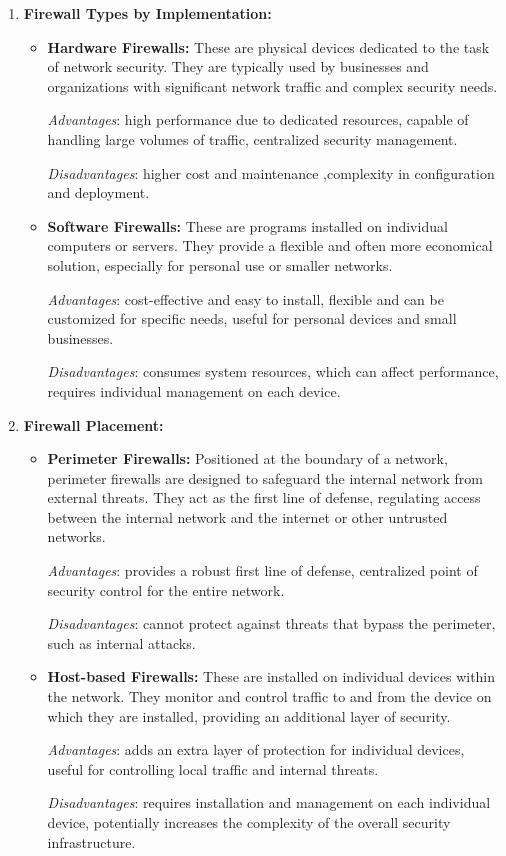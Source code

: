 \begin{enumerate}
    \item \textbf{Firewall Types by Implementation:}
    \begin{itemize}
        \item \textbf{Hardware Firewalls:} These are physical devices dedicated to the task of network security. They are typically used by businesses and organizations with significant network traffic and complex security needs.

        \emph{Advantages}: high performance due to dedicated resources, capable of handling large volumes of traffic, centralized security management.

        \emph{Disadvantages}: higher cost and maintenance ,complexity in configuration and deployment.

        \item \textbf{Software Firewalls:} These are programs installed on individual computers or servers. They provide a flexible and often more economical solution, especially for personal use or smaller networks.

        \emph{Advantages}: cost-effective and easy to install, flexible and can be customized for specific needs, useful for personal devices and small businesses.

        \emph{Disadvantages}: consumes system resources, which can affect performance, requires individual management on each device.
    \end{itemize}

    \item \textbf{Firewall Placement:}
    \begin{itemize}
        \item \textbf{Perimeter Firewalls:} Positioned at the boundary of a network, perimeter firewalls are designed to safeguard the internal network from external threats. They act as the first line of defense, regulating access between the internal network and the internet or other untrusted networks.

        \emph{Advantages}: provides a robust first line of defense, centralized point of security control for the entire network.

        \emph{Disadvantages}: cannot protect against threats that bypass the perimeter, such as internal attacks.


        \item \textbf{Host-based Firewalls:} These are installed on individual devices within the network. They monitor and control traffic to and from the device on which they are installed, providing an additional layer of security.

        \emph{Advantages}: adds an extra layer of protection for individual devices, useful for controlling local traffic and internal threats.

        \emph{Disadvantages}: requires installation and management on each individual device, potentially increases the complexity of the overall security infrastructure.
    \end{itemize}
\end{enumerate}

